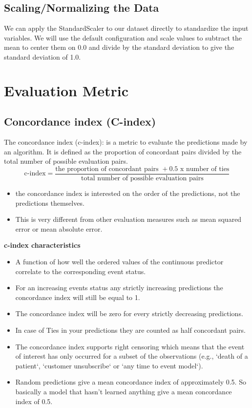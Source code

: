 \documentclass[5 pt]{article}
\begin{document}
\subsection{Scaling/Normalizing the Data}
We can apply the StandardScaler to our dataset directly to standardize the input variables. We will use the default configuration and scale values to subtract the mean to center them on 0.0 and divide by the standard deviation to give the standard deviation of 1.0. 


\section{Evaluation Metric}
\subsection{Concordance index (C-index)}
The concordance index (c-index): is a metric to evaluate the predictions made by an algorithm. It is defined as the proportion of concordant pairs divided by the total number of possible evaluation pairs.
$$ \textrm{c-index}= \frac{\textrm{the proportion of concordant pairs } + 0.5  \textrm{ x number of ties}}{\textrm{total number of possible evaluation pairs}} $$
\begin{itemize}
\item the concordance index is interested on the order of the predictions, not the predictions themselves. 

\item This is very different from other evaluation measures such as mean squared error or mean absolute error.

\end{itemize}

\textbf{c-index characteristics}\\
\begin{itemize}
    \item  A function of how well the ordered values of the continuous predictor correlate to the corresponding event status.
\item  For an increasing events status any strictly increasing predictions the concordance index will still be equal to 1.
\item The concordance index will be zero for every strictly decreasing predictions.
\item In case of Ties in your predictions they are counted as half concordant pairs.
\item  The concordance index supports right censoring which means that the event of interest has only occurred for a subset of the observations (e.g., `death of a patient`,  `customer unsubscribe` or  `any time to event model`). 

\item Random predictions give a mean concordance index of approximately 0.5. So basically a model that hasn’t learned anything give a mean concordance index of 0.5.
\end{itemize}
\end{document}
